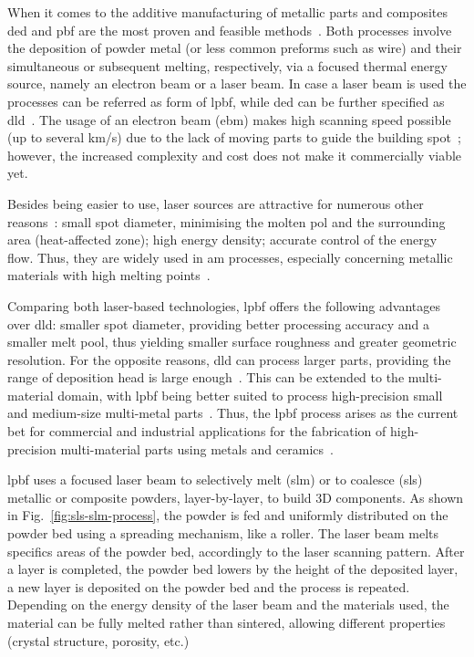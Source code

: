 When it comes to the additive manufacturing of metallic parts and composites
\gls{ded} and \gls{pbf} are the most proven and feasible
methods~\cite{thompson2015overview, vaezi2013multiple}.
%
Both processes involve the deposition of powder metal (or less common preforms
such as wire) and their simultaneous or subsequent melting, respectively, via a
focused thermal energy source, namely an electron beam or a laser beam.
In case a laser beam is used the processes can be referred as form of
\gls{lpbf}, while \gls{ded} can be further specified as
\gls{dld}~\cite{thompson2015overview}. The usage of an electron beam (\gls{ebm}) makes high scanning speed possible (up to several
km/s) due to the lack of moving parts to guide the building spot~\cite{vayre2012metallic}; however, the increased complexity and cost does not
make it commercially viable yet.

Besides being easier to use, laser sources are attractive for numerous other
reasons~\cite{yang2016role}: small spot diameter, minimising the molten pol and the surrounding area
(heat-affected zone); high energy density; accurate control of the energy flow.
Thus, they are widely used in \gls{am} processes, especially concerning metallic
materials with high melting points~\cite{collins2016microstructural}.

Comparing both laser-based technologies, \gls{lpbf} offers the following
advantages over \gls{dld}: smaller spot diameter, providing better processing
accuracy and a smaller
melt pool, thus yielding smaller surface roughness and greater geometric
resolution. For the opposite reasons, \gls{dld} can process larger parts,
providing the range of deposition head is large
enough~\cite{wei2020overview}. This can be extended to the multi-material
domain, with \gls{lpbf} being better suited to process high-precision small and
medium-size multi-metal parts~\cite{wei2020overview}. Thus, the \gls{lpbf}
process arises as the current bet for commercial and industrial applications for
the fabrication of high-precision multi-material parts using metals and
ceramics~\cite{aconityMachinesSite, slm500, eosM300, trumpfTruprint500,
  auroraLabsRMP1, mussatto2022research}.

\gls{lpbf} uses a focused laser beam to selectively melt (\gls{slm}) or to
coalesce (\gls{sls}) metallic or composite powders, layer-by-layer, to build 3D components.
As shown in Fig.~\ref{fig:sls-slm-process}, the powder is fed and
uniformly distributed on the powder bed using a spreading mechanism, like a
roller. The laser beam melts specifics areas of the powder bed, accordingly to
the laser scanning pattern. After a layer is completed, the powder bed lowers by
the height of the deposited layer, a new layer is deposited on the powder bed
and the process is repeated. Depending on the energy density of the laser beam
and the materials used, the material can be fully melted rather than sintered, allowing different properties (crystal structure, porosity, etc.)

